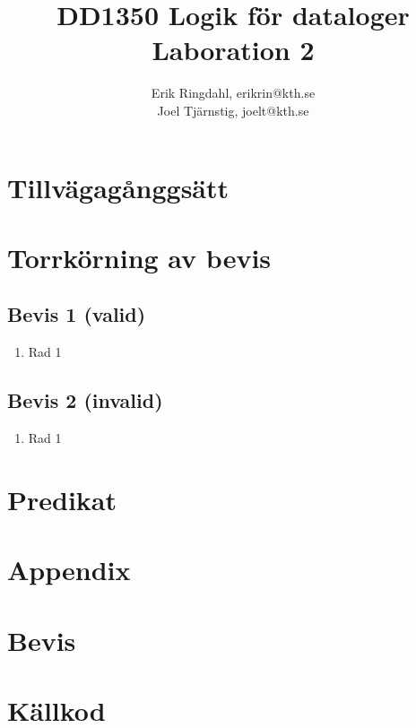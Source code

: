 \documentclass[]{article}
\title{DD1350 Logik för dataloger \\ Laboration 2}
\author{Erik Ringdahl, erikrin@kth.se \\ Joel Tjärnstig, joelt@kth.se}
\begin{document}
\maketitle

\section{Tillvägagånggsätt}

\section{Torrkörning av bevis}
\subsection{Bevis 1 (valid)}


\begin{enumerate}
	\item Rad 1
	
\end{enumerate}

\subsection{Bevis 2 (invalid)}

\begin{enumerate}
	\item Rad 1
	
\end{enumerate}

\section{Predikat}

\clearpage
\section*{Appendix}
\appendix
\section{Bevis}


\clearpage
\section{Källkod}

%
\end{document}
